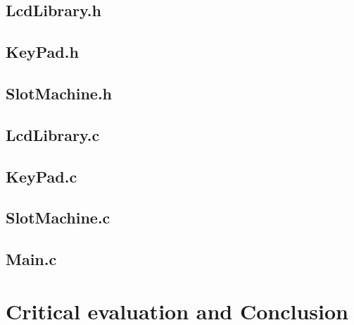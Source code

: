 \documentclass[a4paper,13pt,sffamily,margin=20mm]{memoir}
\let\stdsection\section
\renewcommand\section{\newpage\stdsection}
\begin{document}
\section{LcdLibrary.h}
\begin{small}

\end{small}

\section{KeyPad.h}
\begin{small}

\end{small}

\section{SlotMachine.h}
\begin{small}

\end{small}


\section{LcdLibrary.c}
\begin{small}

\end{small}


\section{KeyPad.c}
\begin{small}

\end{small}


\section{SlotMachine.c}
\begin{small}

\end{small}


\section{Main.c}
\begin{small}

\end{small}




\chapter {Critical evaluation and Conclusion}
\end{document}
